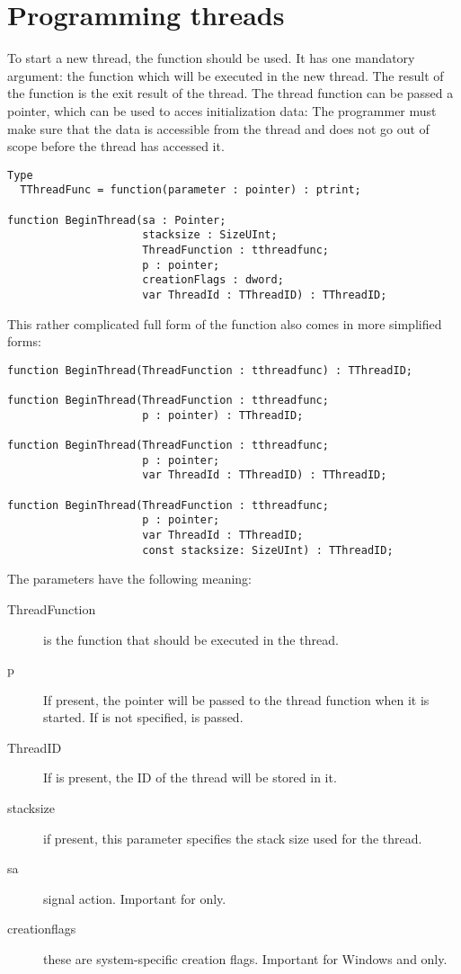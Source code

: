 \section{Programming threads}
To start a new thread, the  function should be used. It has one 
mandatory argument: the function which will be executed in the new thread. The result
of the function is the exit result of the thread. The thread function can be passed a 
pointer, which can be used to acces initialization data: The programmer must make sure 
that the data is accessible from the thread and does not go out of scope before the 
thread has accessed it.
\begin{verbatim}
Type
  TThreadFunc = function(parameter : pointer) : ptrint;

function BeginThread(sa : Pointer;
                     stacksize : SizeUInt;
                     ThreadFunction : tthreadfunc;
                     p : pointer;
                     creationFlags : dword;
                     var ThreadId : TThreadID) : TThreadID;
\end{verbatim}
This rather complicated full form of the function also comes in more simplified
forms:
\begin{verbatim}
function BeginThread(ThreadFunction : tthreadfunc) : TThreadID;

function BeginThread(ThreadFunction : tthreadfunc;
                     p : pointer) : TThreadID;

function BeginThread(ThreadFunction : tthreadfunc;
                     p : pointer; 
                     var ThreadId : TThreadID) : TThreadID;

function BeginThread(ThreadFunction : tthreadfunc;
                     p : pointer;
                     var ThreadId : TThreadID; 
                     const stacksize: SizeUInt) : TThreadID;
\end{verbatim}
The parameters have the following meaning:
\begin{description}
\item[ThreadFunction] is the function that should be executed in the thread.
\item[p] If present, the pointer  will be passed to the thread function 
when it is started. If  is not specified,  is passed. 
\item[ThreadID] If  is present, the ID of the thread will be stored in it. 
\item[stacksize] if present, this parameter specifies the stack size used for the thread.
\item[sa] signal action. Important for \linux only.
\item[creationflags] these are system-specific creation flags. Important for
Windows and \ostwo only.
\end{description}


